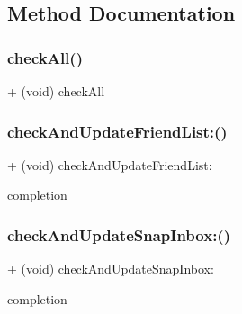 \subsection{Method Documentation}
\hypertarget{interface_restful_snap_c_r_u_d_ab2b89bf5b824eaeca3d5294055e457ae}{}\label{interface_restful_snap_c_r_u_d_ab2b89bf5b824eaeca3d5294055e457ae} 
\subsubsection{\texorpdfstring{check\+All()}{checkAll()}}
{\footnotesize\ttfamily + (void) check\+All \begin{DoxyParamCaption}{ }\end{DoxyParamCaption}}

\hypertarget{interface_restful_snap_c_r_u_d_a399872b75af010ba109388b4cbd565cf}{}\label{interface_restful_snap_c_r_u_d_a399872b75af010ba109388b4cbd565cf} 
\subsubsection{\texorpdfstring{check\+And\+Update\+Friend\+List\+:()}{checkAndUpdateFriendList:()}}
{\footnotesize\ttfamily + (void) check\+And\+Update\+Friend\+List\+: \begin{DoxyParamCaption}\item[{(void($^\wedge$)(B\+O\+OL))}]{completion }\end{DoxyParamCaption}}

\hypertarget{interface_restful_snap_c_r_u_d_a7f1e0da409e374d5584f352907c0a302}{}\label{interface_restful_snap_c_r_u_d_a7f1e0da409e374d5584f352907c0a302} 
\subsubsection{\texorpdfstring{check\+And\+Update\+Snap\+Inbox\+:()}{checkAndUpdateSnapInbox:()}}
{\footnotesize\ttfamily + (void) check\+And\+Update\+Snap\+Inbox\+: \begin{DoxyParamCaption}\item[{(void($^\wedge$)(B\+O\+OL))}]{completion }\end{DoxyParamCaption}}

